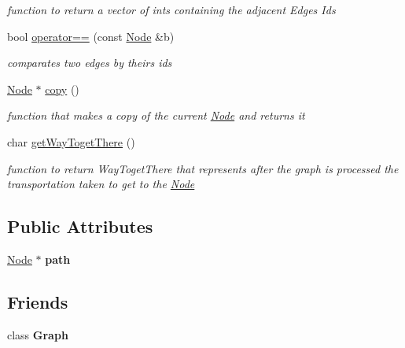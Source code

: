 \begin{DoxyCompactItemize}
\begin{DoxyCompactList}\small\item\em function to return a vector of ints containing the adjacent Edges\textquotesingle{} Ids \end{DoxyCompactList}\item 
bool \hyperlink{class_node_a4633c1db13c9623cea114fe1851ae290}{operator==} (const \hyperlink{class_node}{Node} \&b)
\begin{DoxyCompactList}\small\item\em comparates two edges by theirs ids \end{DoxyCompactList}\item 
\hyperlink{class_node}{Node} $\ast$ \hyperlink{class_node_a8557bfd8ff3979e326611dd919f1987d}{copy} ()
\begin{DoxyCompactList}\small\item\em function that makes a copy of the current \hyperlink{class_node}{Node} and returns it \end{DoxyCompactList}\item 
char \hyperlink{class_node_ac230b85aee55e214e3c255a044bb3118}{get\+Way\+Toget\+There} ()
\begin{DoxyCompactList}\small\item\em function to return Way\+Toget\+There that represents after the graph is processed the transportation taken to get to the \hyperlink{class_node}{Node} \end{DoxyCompactList}\end{DoxyCompactItemize}
\subsection*{Public Attributes}
\begin{DoxyCompactItemize}
\item 
\mbox{\label{class_node_a569c555f532e04a5ef976a54cd3c82a0}} 
\hyperlink{class_node}{Node} $\ast$ {\bfseries path}
\end{DoxyCompactItemize}
\subsection*{Friends}
\begin{DoxyCompactItemize}
\item 
\mbox{\label{class_node_afab89afd724f1b07b1aaad6bdc61c47a}} 
class {\bfseries Graph}
\end{DoxyCompactItemize}


